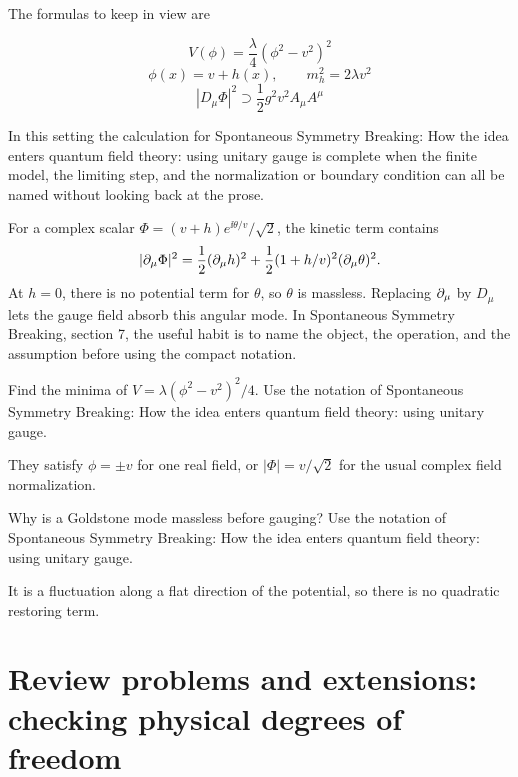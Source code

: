 The formulas to keep in view are

\[
  V(\phi)=\frac{\lambda}{4}(\phi^2-v^2)^2
\]
\[
  \phi(x)=v+h(x),\qquad m_h^2=2\lambda v^2
\]
\[
  |D_\mu\Phi|^2\supset \frac12g^2v^2A_\mu A^\mu
\]

In this setting the calculation for Spontaneous Symmetry Breaking: How the idea enters quantum field theory: using unitary gauge is complete when the finite model, the limiting step, and the normalization or boundary condition can all be named without looking back at the prose.




\begin{example}
For a complex scalar \(\Phi=(v+h)e^{\ii\theta/v}/\sqrt2\), the kinetic term contains
\[
  |\partial_\mu\Phi|^2=\frac12(\partial_\mu h)^2+\frac12(1+h/v)^2(\partial_\mu\theta)^2.
\]
At \(h=0\), there is no potential term for \(\theta\), so \(\theta\) is massless.  Replacing \(\partial_\mu\) by \(D_\mu\) lets the gauge field absorb this angular mode.  In Spontaneous Symmetry Breaking, section 7, the useful habit is to name the object, the operation, and the assumption before using the compact notation.
\end{example}



\begin{exercise}
Find the minima of \(V=\lambda(\phi^2-v^2)^2/4\).  Use the notation of Spontaneous Symmetry Breaking: How the idea enters quantum field theory: using unitary gauge.
\begin{answer}
They satisfy \(\phi=\pm v\) for one real field, or \(|\Phi|=v/\sqrt2\) for the usual complex field normalization.
\end{answer}
\end{exercise}

\begin{exercise}
Why is a Goldstone mode massless before gauging?  Use the notation of Spontaneous Symmetry Breaking: How the idea enters quantum field theory: using unitary gauge.
\begin{answer}
It is a fluctuation along a flat direction of the potential, so there is no quadratic restoring term.
\end{answer}
\end{exercise}



\section{Review problems and extensions: checking physical degrees of freedom}

